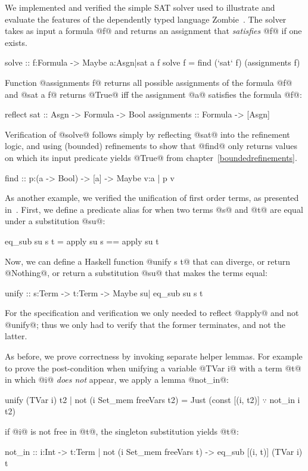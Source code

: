%
We implemented and verified the simple
SAT solver used to illustrate and evaluate
the features of the dependently typed language
Zombie~\citep{Zombie}.
%
The solver takes as input a formula @f@
and returns an assignment that
\emph{satisfies} @f@ if one exists.
%
\begin{code}
solve :: f:Formula -> Maybe {a:Asgn|sat a f}
solve f = find (`sat` f) (assignments f)
\end{code}
%
Function @assignments f@ returns all possible
assignments of the formula @f@ and @sat a f@
returns @True@ iff the assignment @a@ satisfies
the formula @f@:
%
\begin{code}
  reflect sat :: Asgn -> Formula -> Bool
  assignments :: Formula -> [Asgn]
\end{code}
%
Verification of @solve@ follows simply by
reflecting @sat@ into the refinement logic,
and using (bounded) refinements to show
that @find@ only returns values on which
its input predicate yields @True@ from chapter~\ref{boundedrefinements}.
%
\begin{code}
  find :: p:(a -> Bool) -> [a]
       -> Maybe {v:a | p v}
\end{code}


%
As another example, we verified the
unification of first order terms, as
presented in~\citep{Sjoberg2015}.
%
First, we define a predicate alias for
when two terms @s@ and @t@ are equal
under a substitution @su@:
%
\begin{code}
  eq_sub su s t = apply su s == apply su t
\end{code}
%
Now, we can define a Haskell function
@unify s t@ that can diverge, or return
@Nothing@, or return a substitution @su@
that makes the terms equal:
%
\begin{code}
  unify :: s:Term -> t:Term
        -> Maybe {su| eq_sub su s t}
\end{code}
%
For the specification and verification
we only needed to reflect @apply@ and
not @unify@; thus we only had to verify
that the former terminates, and not the latter.
%

%
As before, we prove correctness by invoking
separate helper lemmas.
%
For example to prove the post-condition
when unifying a variable @TVar i@ with
a term @t@ in which @i@ \emph{does not}
appear, we apply a lemma @not_in@:
%
\begin{mcode}
  unify (TVar i) t2
    | not (i Set_mem freeVars t2)
    = Just (const [(i, t2)] $\because$ not_in i t2)

\end{mcode}
\ie if @i@ is not free in @t@,
the singleton substitution yields @t@:
%
\begin{code}
  not_in :: i:Int
         -> t:{Term | not (i Set_mem freeVars t)}
         -> {eq_sub [(i, t)] (TVar i) t}
\end{code}
